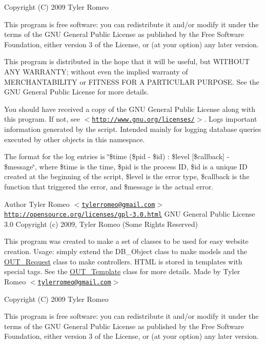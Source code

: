 Copyright (C) 2009 Tyler Romeo

This program is free software: you can redistribute it and/or modify it under the terms of the GNU General Public License as published by the Free Software Foundation, either version 3 of the License, or (at your option) any later version.

This program is distributed in the hope that it will be useful, but WITHOUT ANY WARRANTY; without even the implied warranty of MERCHANTABILITY or FITNESS FOR A PARTICULAR PURPOSE. See the GNU General Public License for more details.

You should have received a copy of the GNU General Public License along with this program. If not, see $<$\href{http://www.gnu.org/licenses/}{\tt http://www.gnu.org/licenses/}$>$. Logs important information generated by the script. Intended mainly for logging database queries executed by other objects in this namespace.

The format for the log entries is \char`\"{}\$time (\$pid -\/ \$id) : \$level \mbox{[}\$callback\mbox{]} -\/ \$message\char`\"{}, where \$time is the time, \$pid is the process ID, \$id is a unique ID created at the beginning of the script, \$level is the error type, \$callback is the function that triggered the error, and \$message is the actual error.

\begin{DoxyAuthor}{Author}
Tyler Romeo $<$\href{mailto:tylerromeo@gmail.com}{\tt tylerromeo@gmail.com}$>$  \href{http://opensource.org/licenses/gpl-3.0.html}{\tt http://opensource.org/licenses/gpl-\/3.0.html} GNU General Public License 3.0  Copyright (c) 2009, Tyler Romeo (Some Rights Reserved)
\end{DoxyAuthor}
This program was created to make a set of classes to be used for easy website creation. Usage: simply extend the DB\_\-Object class to make models and the \hyperlink{classOUT__Request}{OUT\_\-Request} class to make controllers. HTML is stored in templates with special tags. See the \hyperlink{classOUT__Template}{OUT\_\-Template} class for more details. Made by Tyler Romeo $<$\href{mailto:tylerromeo@gmail.com}{\tt tylerromeo@gmail.com}$>$

Copyright (C) 2009 Tyler Romeo

This program is free software: you can redistribute it and/or modify it under the terms of the GNU General Public License as published by the Free Software Foundation, either version 3 of the License, or (at your option) any later version.

